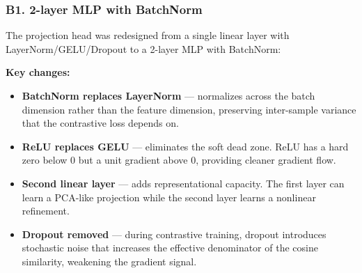 \documentclass[11pt,a4paper]{article}
\begin{document}
\subsubsection{B1. 2-layer MLP with BatchNorm}

The projection head was redesigned from a single linear layer with
LayerNorm/GELU/Dropout to a 2-layer MLP with BatchNorm:

\begin{center}
\end{center}

\textbf{Key changes:}
\begin{itemize}
\item \textbf{BatchNorm replaces LayerNorm} --- normalizes across the
batch dimension rather than the feature dimension, preserving inter-sample
variance that the contrastive loss depends on.
\item \textbf{ReLU replaces GELU} --- eliminates the soft dead zone.
ReLU has a hard zero below 0 but a unit gradient above 0, providing
cleaner gradient flow.
\item \textbf{Second linear layer} --- adds representational capacity.
The first layer can learn a PCA-like projection while the second layer
learns a nonlinear refinement.
\item \textbf{Dropout removed} --- during contrastive training, dropout
introduces stochastic noise that increases the effective denominator of
the cosine similarity, weakening the gradient signal.
\end{itemize}
\end{document}
